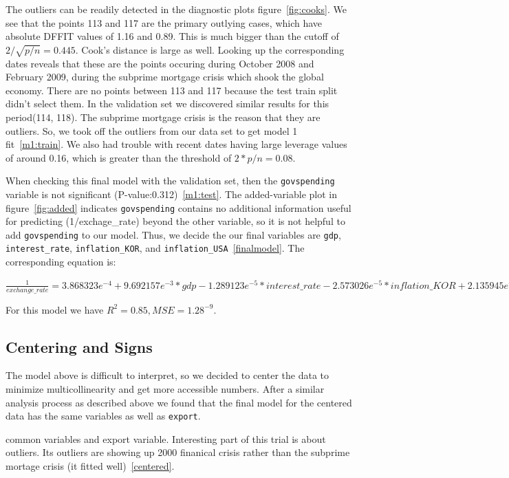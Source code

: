 \documentclass[12pt]{article}
\begin{document}
The outliers can be readily detected in the diagnostic plots 
figure~\ref{fig:cooks}. We see
that the points 113 and 117 are the primary outlying cases, which have
absolute DFFIT values of 1.16 and 0.89. This is much bigger than the cutoff
of $2 / \sqrt{p / n} = 0.445$. Cook's distance is large as well.
Looking up the
corresponding dates reveals that these are the points occuring during
October 2008 and February 2009, during the subprime mortgage crisis
which shook the global economy. There are no points between 113 and 117
because the test train split didn't select them. In the validation set we
discovered similar results for this period(114, 118). The subprime mortgage
crisis is the reason that they are outliers. So, we took off the outliers
from our data set to get model 1 fit~\ref{m1:train}. We also had trouble
with recent dates having large leverage values of around 0.16, which is
greater than the threshold of $2 * p / n = 0.08$.

When checking this final model with the validation set, then the
\texttt{govspending} variable is not
significant (P-value:0.312)~\ref{m1:test}. The added-variable plot in
figure~\ref{fig:added} indicates \texttt{govspending} contains no
additional information useful for predicting (1/exchage\_rate) beyond the
other variable, so it is not helpful to add \texttt{govspending} to our
model. Thus, we decide the our final variables are \texttt{gdp},
\texttt{interest\_rate}, \texttt{inflation\_KOR}, and
\texttt{inflation\_USA}~\ref{finalmodel}. The corresponding equation is:

$\frac{1}{exchange\_rate} = 3.868323e^{-4} + 9.692157e^{-3} * gdp
-1.289123e^{-5} *interest\_rate -2.573026e^{-5} * inflation\_KOR +
2.135945e^{-5}  * inflation\_USA$ 

For this model we have $R^2 = 0.85, MSE = 1.28^{-9}$.

\subsection{Centering and Signs}

The model above is difficult to interpret, so we decided to center the data
to minimize multicollinearity and get more accessible numbers. After a
similar analysis process as described above we found that the final model
for the centered data has the same variables as well as \texttt{export}.

common variables and export variable. Interesting part of this trial is
about outliers. Its outliers are showing up 2000 finanical crisis rather
than the subprime mortage crisis (it fitted well)~\ref{centered}. 
\end{document}
